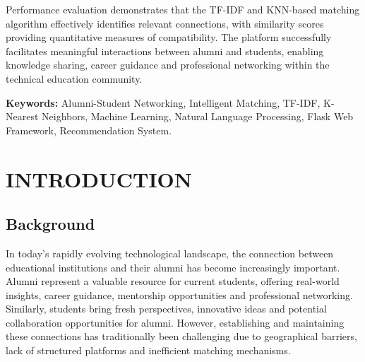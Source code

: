 \documentclass[12pt,a4paper]{report}
\let\origsection\section
\renewcommand{\section}{\needspace{4\baselineskip}\origsection}
\begin{document}
\medskip

\noindent
Performance evaluation demonstrates that the TF-IDF and KNN-based matching algorithm effectively identifies relevant connections, with similarity scores providing quantitative measures of compatibility. The platform successfully facilitates meaningful interactions between alumni and students, enabling knowledge sharing, career guidance and professional networking within the technical education community.

\medskip

\noindent
\textbf{Keywords:} Alumni-Student Networking, Intelligent Matching, TF-IDF, K-Nearest Neighbors, Machine Learning, Natural Language Processing, Flask Web Framework, Recommendation System.


\clearpage
\thispagestyle{plain}
\tableofcontents

\clearpage
\thispagestyle{plain}
\listoftables

\clearpage
\thispagestyle{plain}
\listoffigures


\clearpage
{}
\setcounter{chapter}{0}
\pagestyle{fancy}


\chapter{INTRODUCTION}
\thispagestyle{fancy}

\section{Background}

In today's rapidly evolving technological landscape, the connection between educational institutions and their alumni has become increasingly important. Alumni represent a valuable resource for current students, offering real-world insights, career guidance, mentorship opportunities and professional networking. Similarly, students bring fresh perspectives, innovative ideas and potential collaboration opportunities for alumni. However, establishing and maintaining these connections has traditionally been challenging due to geographical barriers, lack of structured platforms and inefficient matching mechanisms.
\end{document}

